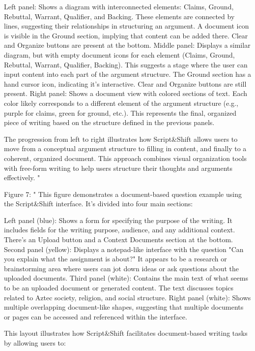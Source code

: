 Left panel:
Shows a diagram with interconnected elements: Claims, Ground, Rebuttal, Warrant, Qualifier, and Backing. These elements are connected by lines, suggesting their relationships in structuring an argument. A document icon is visible in the Ground section, implying that content can be added there. Clear and Organize buttons are present at the bottom.
Middle panel:
Displays a similar diagram, but with empty document icons for each element (Claims, Ground, Rebuttal, Warrant, Qualifier, Backing). This suggests a stage where the user can input content into each part of the argument structure. The Ground section has a hand cursor icon, indicating it's interactive. Clear and Organize buttons are still present.
Right panel:
Shows a document view with colored sections of text. Each color likely corresponds to a different element of the argument structure (e.g., purple for claims, green for ground, etc.). This represents the final, organized piece of writing based on the structure defined in the previous panels.

The progression from left to right illustrates how Script&Shift allows users to move from a conceptual argument structure to filling in content, and finally to a coherent, organized document. This approach combines visual organization tools with free-form writing to help users structure their thoughts and arguments effectively.
"

Figure 7: "
This figure demonstrates a document-based question example using the Script&Shift interface. It's divided into four main sections:

Left panel (blue):
Shows a form for specifying the purpose of the writing. It includes fields for the writing purpose, audience, and any additional context. There's an Upload button and a Context Documents section at the bottom.
Second panel (yellow):
Displays a notepad-like interface with the question "Can you explain what the assignment is about?" It appears to be a research or brainstorming area where users can jot down ideas or ask questions about the uploaded documents.
Third panel (white):
Contains the main text of what seems to be an uploaded document or generated content. The text discusses topics related to Aztec society, religion, and social structure.
Right panel (white):
Shows multiple overlapping document-like shapes, suggesting that multiple documents or pages can be accessed and referenced within the interface.

This layout illustrates how Script&Shift facilitates document-based writing tasks by allowing users to:

